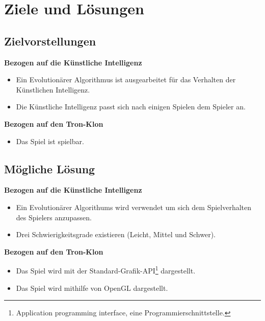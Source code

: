 \pagebreak
\section{Ziele und Lösungen}
\subsection{Zielvorstellungen}
\textbf{Bezogen auf die Künstliche Intelligenz}
\begin{itemize}
	\item Ein Evolutionärer Algorithmus ist ausgearbeitet für das Verhalten der Künstlichen Intelligenz.
	\item Die Künstliche Intelligenz passt sich nach einigen Spielen dem Spieler an.
\end{itemize}
\textbf{Bezogen auf den Tron-Klon}
\begin{itemize}
	\item Das Spiel ist spielbar.
\end{itemize}
\subsection{Mögliche Lösung}
\textbf{Bezogen auf die Künstliche Intelligenz}
\begin{itemize}
	\item Ein Evolutionärer Algorithums wird verwendet um sich dem Spielverhalten des Spielers anzupassen.
	\item Drei Schwierigkeitsgrade existieren (Leicht, Mittel und Schwer).
\end{itemize}
\textbf{Bezogen auf den Tron-Klon}
\begin{itemize}
	\item Das Spiel wird mit der Standard-Grafik-API\footnote{Application programming interface, eine Programmierschnittstelle.} dargestellt.
	\item Das Spiel wird mithilfe von OpenGL dargestellt.
\end{itemize}